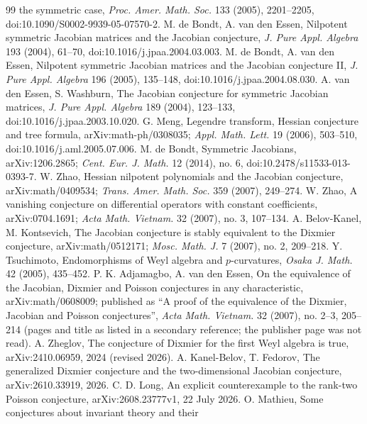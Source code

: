 \documentclass[11pt]{article}
\theoremstyle{remark}
\begin{document}
\begin{thebibliography}{99}
the symmetric case, \emph{Proc. Amer. Math. Soc.} 133 (2005), 2201--2205, doi:10.1090/S0002-9939-05-07570-2.
 M. de Bondt, A. van den Essen, Nilpotent symmetric Jacobian matrices and the Jacobian conjecture, \emph{J. Pure Appl. Algebra} 193 (2004), 61--70, doi:10.1016/j.jpaa.2004.03.003.
 M. de Bondt, A. van den Essen, Nilpotent symmetric Jacobian matrices and the Jacobian conjecture II, \emph{J. Pure Appl. Algebra} 196 (2005), 135--148, doi:10.1016/j.jpaa.2004.08.030.
 A. van den Essen, S. Washburn, The Jacobian conjecture for symmetric Jacobian matrices, \emph{J. Pure Appl. Algebra} 189 (2004), 123--133, doi:10.1016/j.jpaa.2003.10.020.
 G. Meng, Legendre transform, Hessian conjecture and tree formula, arXiv:math-ph/0308035; \emph{Appl. Math. Lett.} 19 (2006), 503--510, doi:10.1016/j.aml.2005.07.006.
 M. de Bondt, Symmetric Jacobians, arXiv:1206.2865; \emph{Cent. Eur. J. Math.} 12 (2014), no. 6, doi:10.2478/s11533-013-0393-7.
 W. Zhao, Hessian nilpotent polynomials and the Jacobian conjecture,
arXiv:math/0409534; \emph{Trans. Amer. Math. Soc.} 359 (2007), 249--274.
 W. Zhao, A vanishing conjecture on differential operators with constant
coefficients, arXiv:0704.1691; \emph{Acta Math. Vietnam.} 32 (2007), no. 3, 107--134.
 A. Belov-Kanel, M. Kontsevich, The Jacobian conjecture is stably equivalent
to the Dixmier conjecture, arXiv:math/0512171; \emph{Mosc. Math. J.} 7 (2007), no. 2, 209--218.
 Y. Tsuchimoto, Endomorphisms of Weyl algebra and $p$-curvatures,
\emph{Osaka J. Math.} 42 (2005), 435--452.
 P. K. Adjamagbo, A. van den Essen, On the equivalence of the Jacobian,
Dixmier and Poisson conjectures in any characteristic, arXiv:math/0608009; published as ``A proof of the equivalence of the Dixmier, Jacobian and Poisson conjectures'', \emph{Acta Math.
Vietnam.} 32 (2007), no. 2--3, 205--214 (pages and title as listed in a secondary reference; the publisher page was not read).
 A. Zheglov, The conjecture of Dixmier for the first Weyl algebra is true,
arXiv:2410.06959, 2024 (revised 2026).
 A. Kanel-Belov, T. Fedorov, The generalized Dixmier conjecture and the two-dimensional Jacobian conjecture, arXiv:2610.33919, 2026.
 C. D. Long, An explicit counterexample to the rank-two Poisson conjecture,
arXiv:2608.23777v1, 22 July 2026.
 O. Mathieu, Some conjectures about invariant theory and their

\end{thebibliography}
\end{document}
